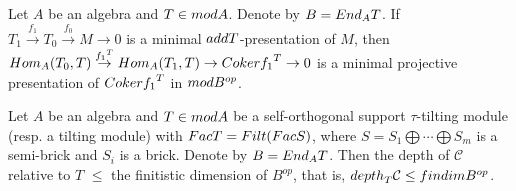 \documentclass[10pt,a4paper]{amsart}
\begin{document}
\begin{lem}\label{3.a} Let $A$ be an algebra and $T\in \textup{mod}A$. Denote by $B=\textup{End}_A T$. If $T_1\stackrel{f_1}{\rightarrow} T_0\stackrel{f_0}{\rightarrow}M\rightarrow 0$ is a minimal ${\rm add}T$-presentation of $M$, then $\textup{Hom}_A(T_0,T)\stackrel{{f_1}^T}{\rightarrow}\textup{Hom}_A(T_1,T)\rightarrow \textup{Coker} {f_1}^T\rightarrow 0$ is a minimal projective presentation of $\textup{Coker} {f_1}^T$ in $\textup{mod}B^{op}$.
\end{lem}

\begin{thm}\label{3.3}
 Let $A$ be an algebra and $T\in \textup{mod}A$ be a self-orthogonal support $\tau$-tilting module (resp. a tilting module) with
$\textup{Fac}T= \textup{Filt(Fac}S)$, where $S=S_1 \bigoplus\cdots \bigoplus S_m$ is a semi-brick and $S_i$ is a brick. Denote by $B = \textup{End}_AT$. Then the depth of $\mathcal{C}$ relative to $T$ $\leq$ the finitistic dimension of $B^{op}$, that is, ${\rm depth}_T \mathcal{C}\leq {\rm findim} B^{op}$.
\end{thm}
\end{document}
